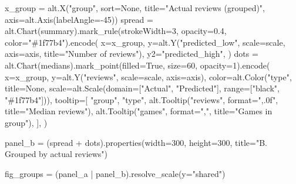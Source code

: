 \documentclass[
  letterpaper,
  DIV=11,
  numbers=noendperiod]{scrartcl}
\newenvironment{Shaded}{\begin{snugshade}}{\end{snugshade}}
\newcommand{\BuiltInTok}[1]{\textcolor[rgb]{0.00,0.23,0.31}{#1}}
\newcommand{\DecValTok}[1]{\textcolor[rgb]{0.68,0.00,0.00}{#1}}
\newcommand{\FloatTok}[1]{\textcolor[rgb]{0.68,0.00,0.00}{#1}}
\newcommand{\NormalTok}[1]{\textcolor[rgb]{0.00,0.23,0.31}{#1}}
\newcommand{\OperatorTok}[1]{\textcolor[rgb]{0.37,0.37,0.37}{#1}}
\newcommand{\StringTok}[1]{\textcolor[rgb]{0.13,0.47,0.30}{#1}}
\newcommand{\VariableTok}[1]{\textcolor[rgb]{0.07,0.07,0.07}{#1}}
\begin{document}
\begin{Shaded}
\begin{Highlighting}[]
\NormalTok{x\_group }\OperatorTok{=}\NormalTok{ alt.X(}\StringTok{"group"}\NormalTok{, sort}\OperatorTok{=}\VariableTok{None}\NormalTok{, title}\OperatorTok{=}\StringTok{"Actual reviews (grouped)"}\NormalTok{, axis}\OperatorTok{=}\NormalTok{alt.Axis(labelAngle}\OperatorTok{={-}}\DecValTok{45}\NormalTok{))}
\NormalTok{spread }\OperatorTok{=}\NormalTok{ alt.Chart(summary).mark\_rule(strokeWidth}\OperatorTok{=}\DecValTok{3}\NormalTok{, opacity}\OperatorTok{=}\FloatTok{0.4}\NormalTok{, color}\OperatorTok{=}\StringTok{"\#1f77b4"}\NormalTok{).encode(}
\NormalTok{    x}\OperatorTok{=}\NormalTok{x\_group,}
\NormalTok{    y}\OperatorTok{=}\NormalTok{alt.Y(}\StringTok{"predicted\_low"}\NormalTok{, scale}\OperatorTok{=}\NormalTok{scale, axis}\OperatorTok{=}\NormalTok{axis, title}\OperatorTok{=}\StringTok{"Number of reviews"}\NormalTok{),}
\NormalTok{    y2}\OperatorTok{=}\StringTok{"predicted\_high"}\NormalTok{,}
\NormalTok{)}
\NormalTok{dots }\OperatorTok{=}\NormalTok{ alt.Chart(medians).mark\_point(filled}\OperatorTok{=}\VariableTok{True}\NormalTok{, size}\OperatorTok{=}\DecValTok{60}\NormalTok{, opacity}\OperatorTok{=}\DecValTok{1}\NormalTok{).encode(}
\NormalTok{    x}\OperatorTok{=}\NormalTok{x\_group,}
\NormalTok{    y}\OperatorTok{=}\NormalTok{alt.Y(}\StringTok{"reviews"}\NormalTok{, scale}\OperatorTok{=}\NormalTok{scale, axis}\OperatorTok{=}\NormalTok{axis),}
\NormalTok{    color}\OperatorTok{=}\NormalTok{alt.Color(}\StringTok{"type"}\NormalTok{, title}\OperatorTok{=}\VariableTok{None}\NormalTok{,}
\NormalTok{                    scale}\OperatorTok{=}\NormalTok{alt.Scale(domain}\OperatorTok{=}\NormalTok{[}\StringTok{"Actual"}\NormalTok{, }\StringTok{"Predicted"}\NormalTok{], }\BuiltInTok{range}\OperatorTok{=}\NormalTok{[}\StringTok{"black"}\NormalTok{, }\StringTok{"\#1f77b4"}\NormalTok{])),}
\NormalTok{    tooltip}\OperatorTok{=}\NormalTok{[}
        \StringTok{"group"}\NormalTok{, }\StringTok{"type"}\NormalTok{,}
\NormalTok{        alt.Tooltip(}\StringTok{"reviews"}\NormalTok{, }\BuiltInTok{format}\OperatorTok{=}\StringTok{",.0f"}\NormalTok{, title}\OperatorTok{=}\StringTok{"Median reviews"}\NormalTok{),}
\NormalTok{        alt.Tooltip(}\StringTok{"games"}\NormalTok{, }\BuiltInTok{format}\OperatorTok{=}\StringTok{","}\NormalTok{, title}\OperatorTok{=}\StringTok{"Games in group"}\NormalTok{),}
\NormalTok{    ],}
\NormalTok{)}

\NormalTok{panel\_b }\OperatorTok{=}\NormalTok{ (spread }\OperatorTok{+}\NormalTok{ dots).properties(width}\OperatorTok{=}\DecValTok{300}\NormalTok{, height}\OperatorTok{=}\DecValTok{300}\NormalTok{, title}\OperatorTok{=}\StringTok{"B. Grouped by actual reviews"}\NormalTok{)}

\NormalTok{fig\_groups }\OperatorTok{=}\NormalTok{ (panel\_a }\OperatorTok{|}\NormalTok{ panel\_b).resolve\_scale(y}\OperatorTok{=}\StringTok{"shared"}\NormalTok{)}
\end{Highlighting}
\end{Shaded}
\end{document}
